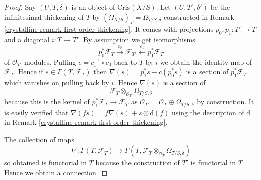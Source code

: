 \begin{proof}

Say $(U, T, \delta)$ is an object of $\text{Cris}(X/S)$.
Let $(U, T', \delta')$ be the infinitesimal thickening of $T$
by $(\Omega_{X/S})_T = \Omega_{T/S, \delta}$
constructed in Remark \ref{crystalline-remark-first-order-thickening}.
It comes with projections $p_0, p_1 : T' \to T$
and a diagonal $i : T \to T'$. By assumption we get
isomorphisms
$$
p_0^*\mathcal{F}_T \xrightarrow{c_0}
\mathcal{F}_{T'} \xleftarrow{c_1}
p_1^*\mathcal{F}_T
$$
of $\mathcal{O}_{T'}$-modules. Pulling $c = c_1^{-1} \circ c_0$
back to $T$ by $i$ we obtain the identity map
of $\mathcal{F}_T$. Hence if $s \in \Gamma(T, \mathcal{F}_T)$
then $\nabla(s) = p_1^*s - c(p_0^*s)$ is a section of
$p_1^*\mathcal{F}_T$ which vanishes on pulling back by $i$. Hence
$\nabla(s)$ is a section of
$$
\mathcal{F}_T
\otimes_{\mathcal{O}_T}
\Omega_{T/S, \delta}
$$
because this is the kernel of $p_1^*\mathcal{F}_T \to \mathcal{F}_T$
as $\mathcal{O}_{T'} = \mathcal{O}_T \oplus \Omega_{T/S, \delta}$
by construction. It is easily verified that $\nabla(fs) =
f\nabla(s) + s \otimes \text{d}(f)$ using the description of
$\text{d}$ in Remark \ref{crystalline-remark-first-order-thickening}.

\medskip\noindent
The collection of maps
$$
\nabla : \Gamma(T, \mathcal{F}_T) \to
\Gamma(T, \mathcal{F}_T \otimes_{\mathcal{O}_T} \Omega_{T/S, \delta})
$$
so obtained is functorial in $T$ because the construction of $T'$
is functorial in $T$. Hence we obtain a connection.


\end{proof}
